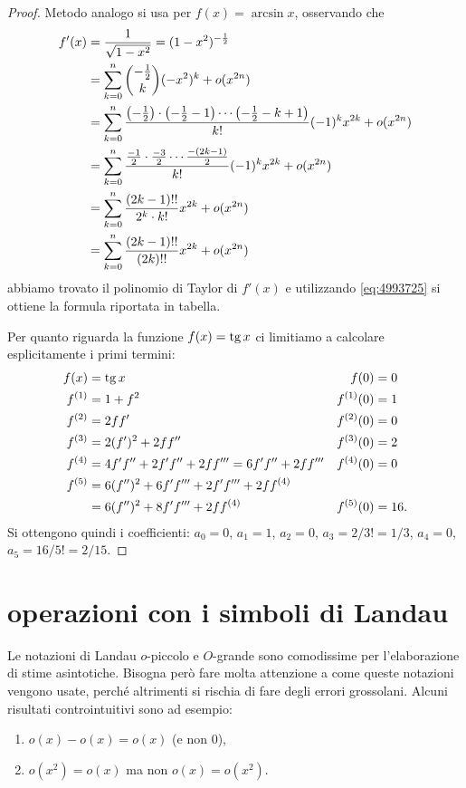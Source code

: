 \begin{proof}
Metodo analogo si usa per $f(x)=\arcsin x$, osservando che
\begin{align*}
  f'(x) &= \frac{1}{\sqrt{1-x^2}}
  = (1-x^2)^{-\frac 1 2} \\
  &= \sum_{k=0}^n {-\frac 1 2 \choose k} (-x^2)^k + o(x^{2n}) \\
  &= \sum_{k=0}^n \frac{{\left( -\frac 1 2 \right)}\cdot {\left( -\frac 1 2 - 1 \right)}\cdots {\left( -\frac 1 2 - k+1 \right)}}{k!}(-1)^k x^{2k} + o(x^{2n}) \\
  &= \sum_{k=0}^n \frac{\frac{-1}{2} \cdot \frac{-3}{2}\cdots \frac{-(2k-1)}{2}}{k!}(-1)^k x^{2k} + o(x^{2n}) \\
  &= \sum_{k=0}^n \frac{(2k-1)!!}{2^k \cdot k!}x^{2k} + o(x^{2n}) \\
  &= \sum_{k=0}^n \frac{(2k-1)!!}{(2k)!!}x^{2k} + o(x^{2n})
 \end{align*}
abbiamo trovato il polinomio di Taylor di $f'(x)$ e utilizzando \eqref{eq:4993725}
si ottiene la formula riportata in tabella.

Per quanto riguarda la funzione $f(x) = \operatorname{tg} x$ ci limitiamo a calcolare esplicitamente i primi termini:
\begin{align*}
  f(x) &= \operatorname{tg} x
  & f(0)&=0\\
  f^{(1)} &= 1+ f^2
  & f^{(1)}(0) &= 1\\
  f^{(2)} &= 2ff'
  & f^{(2)}(0) &= 0 \\
  f^{(3)} &= 2(f')^2 + 2f f''
  & f^{(3)}(0) &= 2 \\
  f^{(4)} &= 4 f' f'' + 2 f' f'' + 2 f f''' = 6 f' f'' + 2 f f'''
   & f^{(4)}(0) &= 0 \\
   f^{(5)} &= 6 (f'')^2 + 6 f' f''' + 2 f' f''' + 2 f f^{(4)}&&\\
           &= 6 (f'')^2 + 8 f' f''' + 2 f f^{(4)}
    & f^{(5)}(0) &= 16.
\end{align*}
Si ottengono quindi i coefficienti:
 $a_0 = 0$, $a_1 = 1$, $a_2 = 0$, $a_3 = 2/3! = 1/3$, $a_4=0$, $a_5 = 16/ 5! = 2/15$.
\end{proof}

\section{operazioni con i simboli di Landau}

Le
%
%
%
%
%
%
notazioni di Landau $o$-piccolo e $O$-grande sono comodissime per
l'elaborazione di stime asintotiche. Bisogna però fare molta attenzione a come queste notazioni vengono usate, perché altrimenti si rischia di fare degli errori grossolani. Alcuni risultati controintuitivi sono ad esempio:
\begin{enumerate}
\item $o(x) - o(x) = o(x)$ (e non $0$),
\item $o(x^2) = o(x)$ ma non $o(x) = o(x^2)$.
\end{enumerate}

